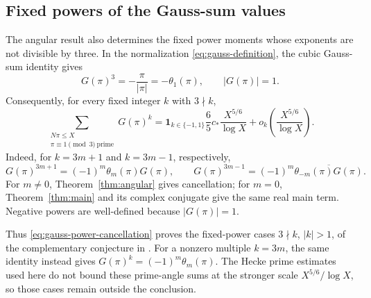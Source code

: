 \subsection{Fixed powers of the Gauss-sum values}

The angular result also determines the fixed power moments whose
exponents are not divisible by three. In the normalization
\eqref{eq:gauss-definition}, the cubic Gauss-sum identity
\cite[Equation (1.8)]{DR2024} gives
\[
 G(\pi)^3=-\frac{\pi}{|\pi|}=-\theta_1(\pi),
 \qquad |G(\pi)|=1.
\]
Consequently, for every fixed integer $k$ with $3\nmid k$,
\begin{equation}\label{eq:gauss-power-cancellation}
 \sum_{\substack{N\pi\le X\\\pi\equiv1\pmod3\ \mathrm{prime}}}
       G(\pi)^k
 =\boldsymbol1_{k\in\{-1,1\}}\frac65c_*
       \frac{X^{5/6}}{\log X}
   +o_k\!\left(\frac{X^{5/6}}{\log X}\right).
\end{equation}
Indeed, for $k=3m+1$ and $k=3m-1$, respectively,
\[
 G(\pi)^{3m+1}=(-1)^m\theta_m(\pi)G(\pi),
 \qquad
 G(\pi)^{3m-1}=(-1)^m
                  \overline{\theta_{-m}(\pi)G(\pi)}.
\]
For $m\ne0$, Theorem~\ref{thm:angular} gives cancellation; for
$m=0$, Theorem~\ref{thm:main} and its complex conjugate give the
same real main term. Negative powers are well-defined because
$|G(\pi)|=1$.

Thus \eqref{eq:gauss-power-cancellation} proves the fixed-power
cases $3\nmid k$, $|k|>1$, of the complementary conjecture in
\cite[Equation (1.9)]{DR2024}. For a nonzero multiple $k=3m$,
the same identity instead gives
$G(\pi)^k=(-1)^m\theta_m(\pi)$. The Hecke prime estimates used
here do not bound these prime-angle sums at the stronger scale
$X^{5/6}/\log X$, so those cases remain outside the conclusion.
